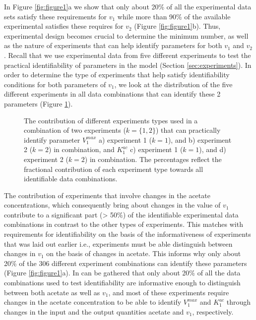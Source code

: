 \documentclass[10pt]{article}
\begin{document}
In Figure \ref{fig:figure1}a we show that only about 20\% of all the experimental data sets satisfy these requirements for $v_1$ while more than 90\% of the available experimental satisfies these requires for $v_2$ (Figure \ref{fig:figure1}b). Thus, experimental design becomes crucial to determine the minimum number, as well as the nature of experiments that can help identify parameters for both $v_1$ and $v_2$. Recall that we use experimental data from five different experiments to test the practical identifiability of parameters in the model (Section \ref{sec:experiments}).
In order to determine the type of experiments that help satisfy identifiability conditions for both parameters of $v_1$, we look at the distribution of the five different experiments in all data combinations that can identify these 2 parameters (Figure \ref{fig:figure2}).

\begin{figure}[!tbhp]
	\caption{The contribution of different experiments types used in a combination of two experiments ($k = \{1, 2\}$) that can practically identify parameter $V_1^{max}$ a) experiment 1 ($k=1$), and b) experiment 2 ($k=2$) in combination, and $K_1^{ac}$ c) experiment 1 ($k=1$), and d) experiment 2 ($k=2$) in combination. The percentages reflect the fractional contribution of each experiment type towards all identifiable data combinations.}\label{fig:figure2}
\end{figure} 

The contribution of experiments that involve changes in the acetate concentrations, which consequently bring about changes in the value of $v_1$ contribute to a significant part (> 50\%) of the identifiable experimental data combinations in contrast to the other types of experiments. This matches with requirements for identifiability on the basis of the informativeness of experiments that was laid out earlier i.e., experiments must be able distinguish between changes in $v_1$ on the basis of changes in acetate. This informs why only about 20\% of the 306 different experiment combinations can identify these parameters (Figure \ref{fig:figure1}a). In can be gathered that only about 20\% of all the data combinations used to test identifiability are informative enough to distinguish between both acetate as well as $v_1$, and most of these experiments require changes in the acetate concentration to be able to identify $V_1^{max}$ and $K_1^{ac}$ through changes in the input and the output quantities acetate and $v_1$, respectively.
\end{document}
